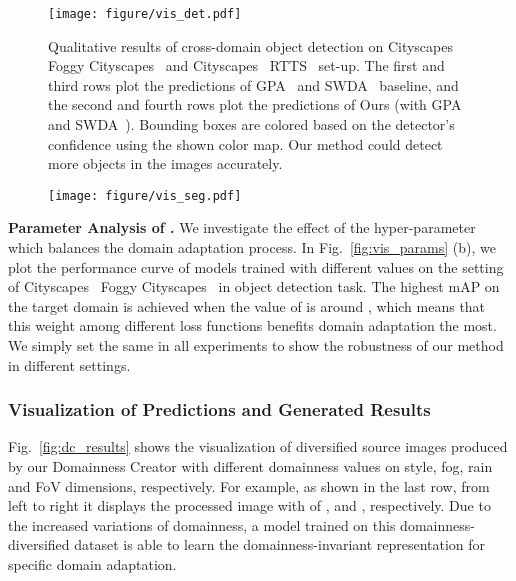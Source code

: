 \documentclass[10pt,journal,compsoc]{IEEEtran}
\begin{document}
\begin{figure*}[htbp]
\centering
\texttt{[image: figure/vis\_det.pdf]}
\caption{
Qualitative results of cross-domain object detection on Cityscapes~\cite{cordts2016cityscapes}  Foggy Cityscapes~\cite{FoggyCity} and Cityscapes~\cite{cordts2016cityscapes}  RTTS~\cite{RTTS} set-up. The first and third rows plot the predictions of GPA~\cite{GPA} and SWDA~\cite{SWDA} baseline, and the second and fourth rows plot the predictions of Ours (with GPA~\cite{GPA} and SWDA~\cite{SWDA}). Bounding boxes are colored based on the detector's confidence using the shown color map. 
Our method could detect more objects in the images accurately.
}
\label{fig:c2f_det}
\vspace{-1mm}
\end{figure*}

 \begin{figure*}[t!]{
\centering
    \texttt{[image: figure/vis\_seg.pdf]}
\label{fig:v2c_kitti}}
\vspace{-3mm}
\end{figure*}






\noindent \textbf{Parameter Analysis of .}  
We investigate the effect of the hyper-parameter  which balances the domain adaptation process. 
In Fig.~\ref{fig:vis_params} (b), we plot the performance curve of models trained with different  values on the setting of Cityscapes~\cite{cordts2016cityscapes}  Foggy Cityscapes~\cite{FoggyCity} in object detection task.  
The highest mAP on the target domain is
achieved when the value of    is around , which means that this weight among
different loss functions benefits domain adaptation the most. 
We simply set the same  in all experiments to show the robustness of our method in different settings.  

\subsubsection{Visualization of Predictions and Generated Results}
\label{sec:visualization}
Fig.~\ref{fig:dc_results} shows the visualization of diversified source images produced by our Domainness Creator with different domainness values on style, fog, rain and FoV dimensions, respectively. For example, as shown in the last row, from left to right it displays the processed image with  of ,   and , respectively. Due to the increased variations of domainness, a model  trained on this domainness-diversified dataset is able to learn the domainness-invariant representation for specific domain adaptation. 
 
\end{document}
